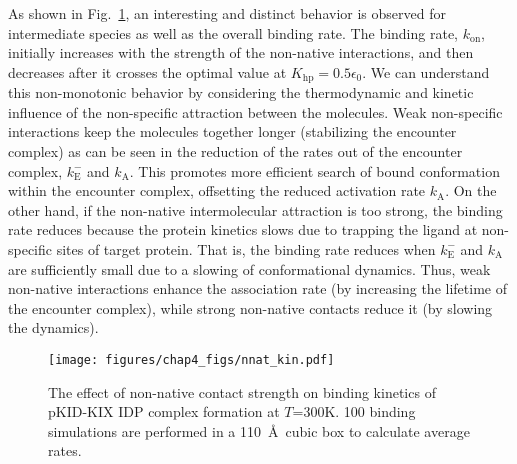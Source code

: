\documentclass[../talant.diss.submit.tex]{subfiles}
\begin{document}
As shown in Fig.~\ref{fig:nnat_kin}, an interesting and distinct behavior is observed
for intermediate species as well as the overall binding rate.
The binding rate, $k_{\mathrm{on}}$, initially increases with the strength of
the non-native interactions, and then decreases after it crosses the optimal
value at $K_{\mathrm{hp}} =0.5\epsilon_0$. We can understand this non-monotonic behavior
by considering the thermodynamic and kinetic influence of the non-specific attraction
between the molecules. Weak non-specific interactions
keep the molecules together longer (stabilizing the encounter complex) as can be seen
in the reduction of the rates out of the encounter complex, $k_\mathrm{E}^-$ and $k_\mathrm{A}$.
This promotes more efficient search
of bound conformation within the encounter complex, offsetting the reduced activation rate $k_\mathrm{A}$. On the other hand, if the non-native intermolecular attraction is too strong,
the binding rate reduces because the protein kinetics slows due to trapping
the ligand at non-specific sites of target protein. That is, the binding rate
reduces when $k_\mathrm{E}^-$ and $k_\mathrm{A}$ are sufficiently small due
to a slowing of conformational dynamics.
Thus, weak non-native interactions enhance the
association rate (by increasing the lifetime of the encounter complex),
while strong non-native contacts reduce it (by slowing the dynamics).
%                                                                                                        
\begin{figure}[h!]                                                                                       
\begin{centering}                                                                                        
    \texttt{[image: figures/chap4\_figs/nnat\_kin.pdf]}
    \caption{The effect of non-native contact strength on binding kinetics of
      pKID-KIX IDP complex formation at $T$=300K. 100 binding simulations
      are performed in a 110~\AA~cubic box to calculate average rates.}                    
\label{fig:nnat_kin}                                                                                   
\end{centering}                                                                                          
\end{figure}                                                                                                
%                                                                                                           
%
\end{document}
